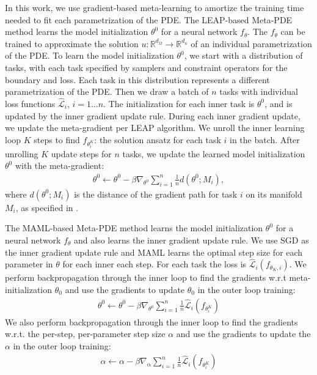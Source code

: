 In this work, we use gradient-based meta-learning to amortize the training time needed to fit each parametrization of the PDE. The LEAP-based Meta-PDE method learns the model initialization $\theta^0$ for a neural network $f_\theta$. The  $f_\theta$ can be trained to approximate the solution $u: \mathbb{R}^{d_\Omega} \to \mathbb{R}^{d_u}$ of an individual parametrization of the PDE. To learn the model initialization $\theta^0$, we start with a distribution of tasks, with each task specified by samplers and constraint operators for the boundary and loss. Each task in this distribution represents a different parametrization of the PDE. Then we draw a batch of $n$ tasks with individual loss functions $\hat{\mathcal{L}}_i$, $i = 1 ... n$. The initialization for each inner task is $\theta^0$, and is updated by the inner gradient update rule. During each inner gradient update, we update the meta-gradient per LEAP algorithm. We unroll the inner learning loop $K$ steps to find $f_{\theta_i^K}$: the solution ansatz for each task $i$ in the batch. After unrolling $K$ update steps for $n$ tasks, we update the learned model initialization $\theta^0$ with the meta-gradient:
\begin{align}
    \theta^0 \leftarrow \theta^0 - \beta \nabla_{\theta^0}\sum_{i=1}^n \frac{1}{n} d(\theta^0; M_i),
\end{align}
where $d(\theta^0; M_i)$ is the distance of the gradient path for task $i$ on its manifold $M_i$, as specified in \citep{flennerhag2018transferring}.

The MAML-based Meta-PDE method learns the model initialization $\theta^0$ for a neural network $f_\theta$ and also learns the inner gradient update rule. We use SGD as the inner gradient update rule and MAML learns the optimal step size for each parameter in $\theta$ for each inner each step. For each task the loss is $\hat{\mathcal{L}}_i(f_{\theta_K, i})$. We perform backpropagation through the inner loop to find the gradients w.r.t meta-initialization $\theta_0$ and use the gradients to update $\theta_0$ in the outer loop training:
\begin{align}
    \theta^0 \leftarrow \theta^0 - \beta \nabla_{\theta^0} \sum_{i=1}^n  \frac{1}{n} \hat{\mathcal{L}}_i(f_{\theta^K _i})
\end{align}
We also perform backpropagation through the inner loop to find the gradients w.r.t. the per-step, per-parameter step size $\alpha$ and use the gradients to update the $\alpha$ in the outer loop training:
\begin{align}
    {\alpha}  \leftarrow {\alpha} - \beta  \nabla_{\alpha} \sum_{i=1}^n  \frac{1}{n} \hat{\mathcal{L}}_i(f_{\theta^K_i})
\end{align}

